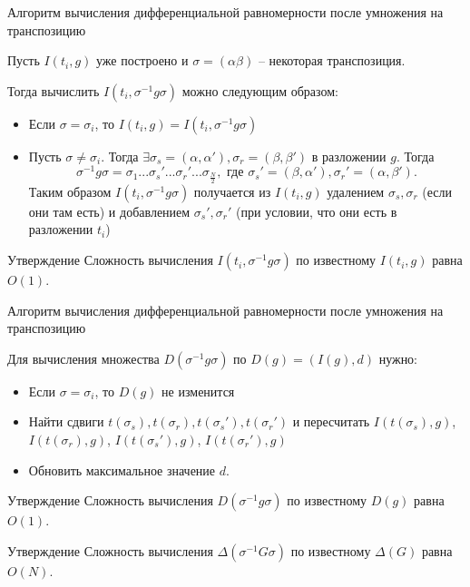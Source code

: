 \documentclass{beamer}
\begin{document}
\begin{frame}{Алгоритм вычисления дифференциальной равномерности после умножения на транспозицию}

Пусть $I(t_i,g)$ уже построено и $\sigma = (\alpha \beta)$ -- некоторая транспозиция.

Тогда вычислить $I(t_i,\sigma^{-1}g\sigma)$ можно следующим образом:
\begin{itemize}
\item Если $\sigma = \sigma_i$, то $I(t_i,g)=I(t_i,\sigma^{-1}g\sigma)$
\item Пусть $\sigma \neq \sigma_i$. Тогда $\exists \sigma_s=(\alpha, \alpha'),\sigma_r=(\beta, \beta')$ в разложении $g$. Тогда $$\sigma^{-1}g\sigma = \sigma_1...\sigma_s'...\sigma_r'...\sigma_{\frac{N}{2}}, \text{ где } \sigma_s'=(\beta, \alpha'),\sigma_r'=(\alpha, \beta').$$
Таким образом $I(t_i, \sigma^{-1}g\sigma)$ получается из $I(t_i,g)$ удалением $\sigma_s,\sigma_r$ (если они там есть) и добавлением $\sigma_s',\sigma_r'$ (при условии, что они есть в разложении $t_i$)
\end{itemize}

\begin{block}{Утверждение}
 Сложность вычисления $I(t_i,\sigma^{-1}g\sigma)$ по известному $I(t_i,g)$ равна $O(1)$.
\end{block}
\end{frame}


\begin{frame}{Алгоритм вычисления дифференциальной равномерности после умножения на транспозицию}

Для вычисления множества $D(\sigma^{-1}g\sigma)$ по $D(g) = (I(g), d)$ нужно:
\begin{itemize}
\item Если $\sigma = \sigma_i$, то $D(g)$ не изменится
\item Найти сдвиги $t(\sigma_s), t(\sigma_r), t(\sigma_s'), t(\sigma_r')$ и пересчитать $I(t(\sigma_s),g)$, $I(t(\sigma_r),g)$, $I( t(\sigma_s'),g)$, $I(t(\sigma_r'),g)$
\item Обновить максимальное значение $d$.
\end{itemize}

\begin{block}{Утверждение}
 Сложность вычисления $D(\sigma^{-1}g\sigma)$ по известному $D(g)$ равна $O(1)$.
\end{block}

\begin{block}{Утверждение}
 Сложность вычисления $\Delta(\sigma^{-1} G  \sigma)$ по известному $\Delta(G)$ равна $O(N)$.
\end{block}
\end{frame}
\end{document}
